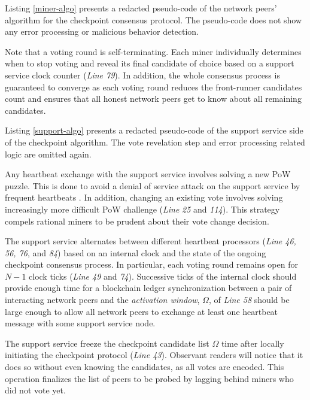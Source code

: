 Listing \ref{miner-algo} presents a redacted pseudo-code of the network peers' algorithm for the checkpoint consensus protocol. The pseudo-code does not show any error processing or malicious behavior detection.

\lstset{caption=A miner's perspective of the checkpoint protocol, label=miner-algo}
 

Note that a voting round is self-terminating. Each miner individually determines when to stop voting and reveal its final candidate of choice based on a support service clock counter (\textit{Line 79}). In addition, the whole consensus process is guaranteed to converge as each voting round reduces the front-runner candidates count and ensures that all honest network peers get to know about all remaining candidates. 

Listing \ref{support-algo} presents a redacted pseudo-code of the support service side of the checkpoint algorithm. The vote revelation step and error processing related logic are omitted again.

\lstset{caption=Support service's perspective of the checkpoint protocol, label=support-algo}


Any heartbeat exchange with the support service involves solving a new PoW puzzle. This is done to avoid a denial of service attack on the support service by frequent heartbeats \cite{Back02hashcash}. In addition, changing an existing vote involves solving increasingly more difficult PoW challenge (\textit{Line} \textit{25} and \textit{114}). This strategy compels rational miners to be prudent about their vote change decision. 

The support service alternates between different heartbeat processors (\textit{Line 46, 56, 76}, and \textit{84}) based on an internal clock and the state of the ongoing checkpoint consensus process. In particular, each voting round remains open for $N - 1$ clock ticks (\textit{Line 49} and \textit{74}). Successive ticks of the internal clock should provide enough time for a blockchain ledger synchronization between a pair of interacting network peers and the \textit{activation window}, $\Omega$, of \textit{Line 58} should be large enough to allow all network peers to exchange at least one heartbeat message with some support service node.

The support service freeze the checkpoint candidate list $\Omega$ time after locally initiating the checkpoint protocol (\textit{Line 43}). Observant readers will notice that it does so without even knowing the candidates, as all votes are encoded. This operation finalizes the list of peers to be probed by lagging behind miners who did not vote yet.    
        
